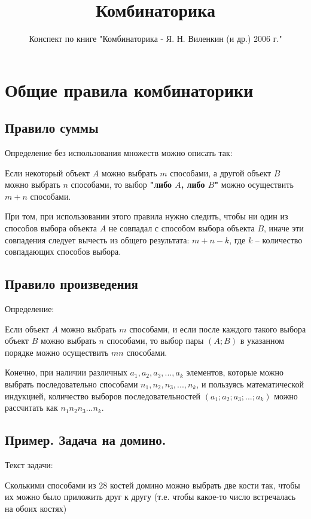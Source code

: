 \documentclass{article}
\title{Комбинаторика}
\author{Конспект по книге "Комбинаторика - Я. Н. Виленкин (и др.) 2006 г." }
\begin{document}
\maketitle
\tableofcontents

\section{Общие правила комбинаторики}

\subsection{Правило суммы}
Определение без использования множеств можно описать так:

\begin{displayquote}
Если некоторый объект $A$ можно выбрать $m$ способами, а другой объект $B$ можно выбрать $n$ способами, то выбор \textbf{"либо $A$, либо $B$"} можно осуществить $m + n$ способами.
\end{displayquote}

При том, при использовании этого правила нужно следить, чтобы ни один из способов выбора объекта $A$ не совпадал с способом выбора объекта $B$, иначе эти совпадения следует вычесть из общего результата: $m + n - k$, где $k$ -- количество совпадающих способов выбора.

\subsection{Правило произведения}

Определение:
\begin{displayquote}
Если объект $A$ можно выбрать $m$ способами, 
и если после каждого такого выбора объект $B$ можно выбрать $n$ способами, 
то выбор пары $(A; B)$ в указанном порядке можно осуществить $mn$ способами.
\end{displayquote}

Конечно, при наличии различных $a_1, a_2, a_3, ..., a_k$ элементов, 
которые можно выбрать последовательно способами $n_1, n_2, n_3, ..., n_k$,
и пользуясь математической индукцией, количество выборов последовательностей $(a_1; a_2; a_3; ...; a_k)$ 
можно рассчитать как $n_1n_2n_3...n_k$.

\subsection{Пример. Задача на домино.}

Текст задачи:
\begin{displayquote}
Сколькими способами из $28$ костей домино можно выбрать две кости так, 
чтобы их можно было приложить друг к другу (т.е. чтобы какое-то число встречалась на обоих костях)
\end{displayquote} 
\end{document}
